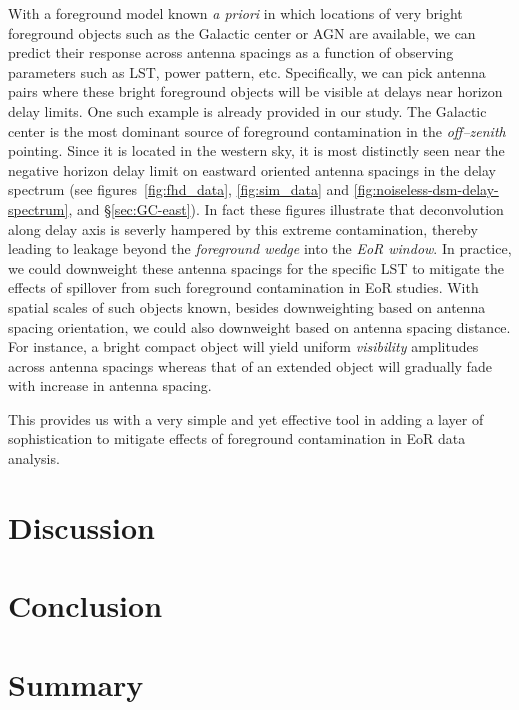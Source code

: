 \documentclass[preprint2,iop,numberedappendix]{emulateapj}
\begin{document}
With a foreground model known {\it a priori} in which locations of very bright foreground objects such as the Galactic center or AGN are available, we can predict their response across antenna spacings as a function of observing parameters such as LST, power pattern, etc. Specifically, we can pick antenna pairs where these bright foreground objects will be visible at delays near horizon delay limits. One such example is already provided in our study. The Galactic center is the most dominant source of foreground contamination in the {\it off--zenith} pointing. Since it is located in the western sky, it is most distinctly seen near the negative horizon delay limit on eastward oriented antenna spacings in the delay spectrum (see figures~\ref{fig:fhd_data}, \ref{fig:sim_data} and \ref{fig:noiseless-dsm-delay-spectrum}, and \S\ref{sec:GC-east}). In fact these figures illustrate that deconvolution along delay axis is severly hampered by this extreme contamination, thereby leading to leakage beyond the {\it foreground wedge} into the {\it EoR window}. In practice, we could downweight these antenna spacings for the specific LST to mitigate the effects of spillover from such foreground contamination in EoR studies. With spatial scales of such objects known, besides downweighting based on antenna spacing orientation, we could also downweight based on antenna spacing distance. For instance, a bright compact object will yield uniform {\it visibility} amplitudes across antenna spacings whereas that of an extended object will gradually fade with increase in antenna spacing. 

This provides us with a very simple and yet effective tool in adding a layer of sophistication to mitigate effects of foreground contamination in EoR data analysis. %

\section{Discussion}\label{sec:discussion}

\section{Conclusion}\label{sec:conclusion}

\section{Summary}\label{sec:summary}
\end{document}
